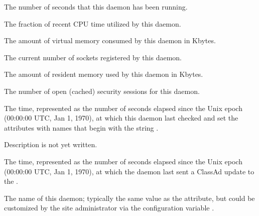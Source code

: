 \begin{description}
\item[\AdAttr{MonitorSelfAge}:] The number of seconds that this daemon
  has been running.

\item[\AdAttr{MonitorSelfCPUUsage}:] The fraction of recent CPU time utilized
  by this daemon. 

\item[\AdAttr{MonitorSelfImageSize}:] The amount of virtual memory consumed by
  this daemon in Kbytes.

\item[\AdAttr{MonitorSelfRegisteredSocketCount}:] The current number of sockets
  registered by this daemon.

\item[\AdAttr{MonitorSelfResidentSetSize}:] The amount of resident memory
  used by this daemon in Kbytes.

\item[\AdAttr{MonitorSelfSecuritySessions}:] The number of open (cached)
  security sessions for this daemon.

\item[\AdAttr{MonitorSelfTime}:] The  time, represented as the number of
  seconds elapsed since the Unix epoch (00:00:00 UTC, Jan 1, 1970),
  at which this daemon last checked and set the attributes with names that
  begin with the string .
  
\item[\AdAttr{MyAddress}:] Description is not yet written.

\item[\AdAttr{MyCurrentTime}:]  The time, represented as the number of 
  seconds elapsed since the Unix epoch (00:00:00 UTC, Jan 1, 1970),
  at which the  daemon last sent a ClassAd update to the
  .

\item[\AdAttr{Name}:] The name of this daemon; typically the same value as
  the  attribute, but could be customized by the site
  administrator via the configuration variable .


\end{description}
